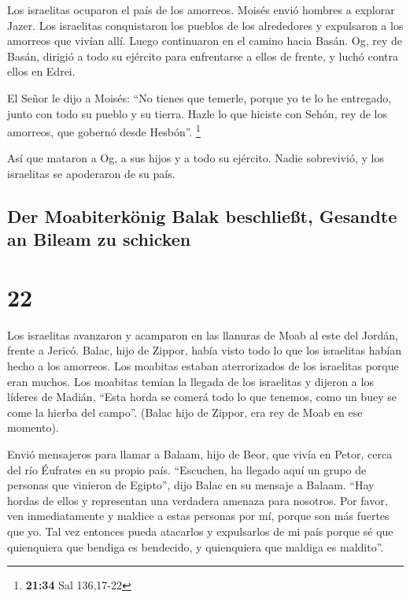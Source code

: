  Los israelitas ocuparon el país de los amorreos.
 Moisés envió hombres a explorar Jazer. Los israelitas
conquistaron los pueblos de los alrededores y expulsaron a los amorreos
que vivían allí.  Luego continuaron en el camino hacia
Basán. Og, rey de Basán, dirigió a todo su ejército para enfrentarse a
ellos de frente, y luchó contra ellos en Edrei.

 El Señor le dijo a Moisés: ``No tienes que temerle,
porque yo te lo he entregado, junto con todo su pueblo y su tierra.
Hazle lo que hiciste con Sehón, rey de los amorreos, que gobernó desde
Hesbón''. \footnote{\textbf{21:34} Sal 136,17-22}

 Así que mataron a Og, a sus hijos y a todo su ejército.
Nadie sobrevivió, y los israelitas se apoderaron de su país.

\hypertarget{der-moabiterkuxf6nig-balak-beschlieuxdft-gesandte-an-bileam-zu-schicken}{%
\subsection{Der Moabiterkönig Balak beschließt, Gesandte an Bileam zu
schicken}\label{der-moabiterkuxf6nig-balak-beschlieuxdft-gesandte-an-bileam-zu-schicken}}

\hypertarget{section-21}{%
\section{22}\label{section-21}}

 Los israelitas avanzaron y acamparon en las llanuras de
Moab al este del Jordán, frente a Jericó.  Balac, hijo de
Zippor, había visto todo lo que los israelitas habían hecho a los
amorreos.  Los moabitas estaban aterrorizados de los
israelitas porque eran muchos. Los moabitas temían la llegada de los
israelitas  y dijeron a los líderes de Madián, ``Esta
horda se comerá todo lo que tenemos, como un buey se come la hierba del
campo''. (Balac hijo de Zippor, era rey de Moab en ese momento).

 Envió mensajeros para llamar a Balaam, hijo de Beor, que
vivía en Petor, cerca del río Éufrates en su propio país. ``Escuchen, ha
llegado aquí un grupo de personas que vinieron de Egipto'', dijo Balac
en su mensaje a Balaam. ``Hay hordas de ellos y representan una
verdadera amenaza para nosotros.  Por favor, ven
inmediatamente y maldice a estas personas por mí, porque son más fuertes
que yo. Tal vez entonces pueda atacarlos y expulsarlos de mi país porque
sé que quienquiera que bendiga es bendecido, y quienquiera que maldiga
es maldito''.

